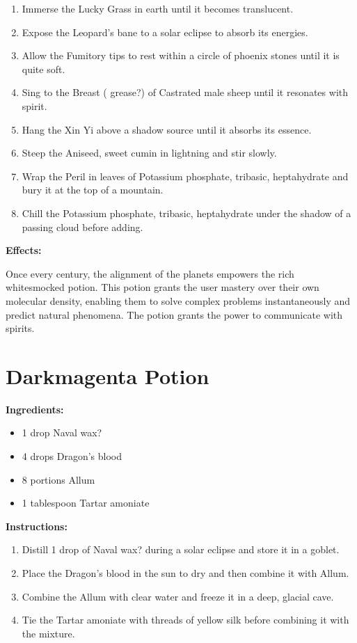 \documentclass{article}
\begin{document}
\begin{enumerate}
  \item Immerse the Lucky Grass in earth until it becomes translucent.
  \item Expose the Leopard's bane to a solar eclipse to absorb its energies.
  \item Allow the Fumitory tips to rest within a circle of phoenix stones until it is quite soft.
  \item Sing to the Breast ( grease?) of Castrated male sheep until it resonates with spirit.
  \item Hang the Xin Yi above a shadow source until it absorbs its essence.
  \item Steep the Aniseed, sweet cumin in lightning and stir slowly.
  \item Wrap the Peril in leaves of Potassium phosphate, tribasic, heptahydrate and bury it at the top of a mountain.
  \item Chill the Potassium phosphate, tribasic, heptahydrate under the shadow of a passing cloud before adding.
\end{enumerate}

\textbf{Effects:}

Once every century, the alignment of the planets empowers the rich whitesmocked potion. This potion grants the user mastery over their own molecular density, enabling them to solve complex problems instantaneously and predict natural phenomena. The potion grants the power to communicate with spirits.

\newpage
\section*{Darkmagenta Potion}

\textbf{Ingredients:}

\begin{itemize}
  \item 1 drop Naval wax?
  \item 4 drops Dragon's blood
  \item 8 portions Allum
  \item 1 tablespoon Tartar amoniate
\end{itemize}

\textbf{Instructions:}

\begin{enumerate}
  \item Distill 1 drop of Naval wax? during a solar eclipse and store it in a goblet.
  \item Place the Dragon's blood in the sun to dry and then combine it with Allum.
  \item Combine the Allum with clear water and freeze it in a deep, glacial cave.
  \item Tie the Tartar amoniate with threads of yellow silk before combining it with the mixture.
\end{enumerate}
\end{document}
